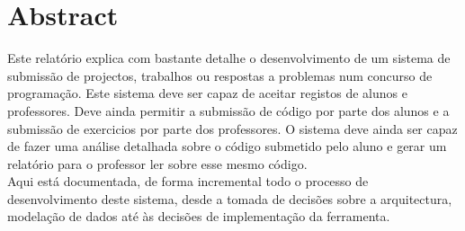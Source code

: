 \thispagestyle{plain}
\chapter*{Abstract}

Este relatório explica com bastante detalhe o desenvolvimento de um sistema de submissão de projectos, trabalhos ou respostas a problemas num concurso de programação.
Este sistema deve ser capaz de aceitar registos de alunos e professores. Deve ainda permitir a submissão
de código por parte dos alunos e a submissão de exercicios por parte dos professores. O sistema deve ainda ser capaz de fazer uma análise detalhada
sobre o código submetido pelo aluno e gerar um relatório para o professor ler sobre esse mesmo código.\\

Aqui está documentada, de forma incremental todo o processo de desenvolvimento deste sistema, desde a tomada de decisões sobre a arquitectura, modelação de dados até
às decisões de implementação da ferramenta.

